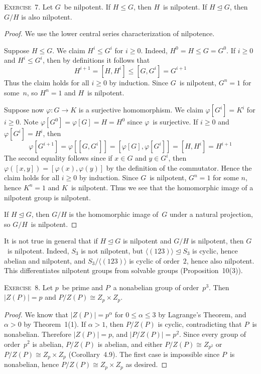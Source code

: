 \documentclass[letterpaper]{article}
\newcommand{\exercise}[1]{\goodbreak\noindent\textsc{Exercise~{#1}.}}
\newcommand{\iso}{\cong}
\newcommand{\subgroup}{\le}
\newcommand{\normal}{\trianglelefteq}
\newcommand{\ord}[1]{|{#1}|}
\newcommand{\gen}[1]{\langle{#1}\rangle}
\begin{document}
\bigskip
\exercise{7}
Let $G$~be nilpotent. If $H\subgroup G$, then $H$~is nilpotent. If $H\normal G$, then $G/H$ is also nilpotent.
\begin{proof}
We use the lower central series characterization of nilpotence.

Suppose $H\subgroup G$. We claim $H^i\subgroup G^i$ for $i\ge0$. Indeed, $H^0=H\subgroup G=G^0$. If $i\ge0$ and $H^i\subgroup G^i$, then by definitions it follows that
$$H^{i+1}=[H,H^i]\subgroup [G,G^i]=G^{i+1}$$
Thus the claim holds for all $i\ge0$ by induction. Since $G$~is nilpotent, $G^n=1$ for some~$n$, so $H^n=1$ and $H$~is nilpotent.

Suppose now $\varphi:G\to K$ is a surjective homomorphism. We claim $\varphi[G^i]=K^i$ for $i\ge0$. Note $\varphi[G^0]=\varphi[G]=H=H^0$ since $\varphi$~is surjective. If $i\ge0$ and $\varphi[G^i]=H^i$, then
$$\varphi[G^{i+1}]=\varphi[[G,G^i]]=[\varphi[G],\varphi[G^i]]=[H,H^i]=H^{i+1}$$
The second equality follows since if $x\in G$ and $y\in G^i$, then $\varphi([x,y])=[\varphi(x),\varphi(y)]$ by the definition of the commutator. Hence the claim holds for all $i\ge0$ by induction. Since $G$~is nilpotent, $G^n=1$ for some $n$, hence $K^n=1$ and $K$~is nilpotent. Thus we see that the homomorphic image of a nilpotent group is nilpotent.

If $H\normal G$, then $G/H$ is the homomorphic image of~$G$ under a natural projection, so $G/H$~is nilpotent.
\end{proof}
\noindent It is not true in general that if $H\normal G$ is nilpotent and $G/H$ is nilpotent, then $G$~is nilpotent. Indeed, $S_3$ is not nilpotent, but $\gen{(123)}\normal S_3$ is cyclic, hence abelian and nilpotent, and $S_3/\gen{(123)}$ is cyclic of order~$2$, hence also nilpotent. This differentiates nilpotent groups from solvable groups (Proposition~10(3)).

\bigskip
\exercise{8}
Let $p$~be prime and $P$~a nonabelian group of order~$p^3$. Then $\ord{Z(P)}=p$ and $P/Z(P)\iso Z_p\times Z_p$.
\begin{proof}
We know that $\ord{Z(P)}=p^{\alpha}$ for $0\le\alpha\le 3$ by Lagrange's Theorem, and $\alpha>0$ by Theorem~1(1). If $\alpha>1$, then $P/Z(P)$ is cyclic, contradicting that $P$~is nonabelian. Therefore $\ord{Z(P)}=p$, and $\ord{P/Z(P)}=p^2$. Since every group of order~$p^2$ is abelian, $P/Z(P)$ is abelian, and either $P/Z(P)\iso Z_{p^2}$ or $P/Z(P)\iso Z_p\times Z_p$ (Corollary~4.9). The first case is impossible since $P$~is nonabelian, hence $P/Z(P)\iso Z_p\times Z_p$ as desired.
\end{proof}
\end{document}
